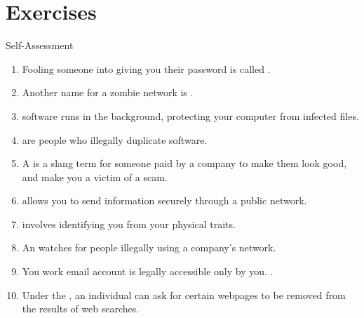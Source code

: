 \documentclass[\main/notes.tex]{subfiles}
\begin{document}
		\section{Exercises}
			\begin{exercise}{Self-Assessment}
				\begin{enumerate}
					\item Fooling someone into giving you their password is called .
					\item Another name for a zombie network is .
					\item {} software runs in the background, protecting your computer from infected files.
					\item {} are people who illegally duplicate software.
					\item A  is a slang term for someone paid by a company to make them look good, and make you a victim of a scam.
					\item {} allows you to send information securely through a public network.
					\item {} involves identifying you from your physical traits.
					\item An  watches for people illegally using a company's network.
					\item You work email account is legally accessible only by you. .
					\item Under the , an individual can ask for certain webpages to be removed from the results of web searches.
				\end{enumerate}
			\end{exercise}

	\vbox{}
\end{document}
